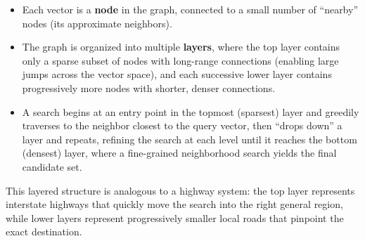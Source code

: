 \documentclass[11pt,a4paper]{article}
\begin{document}
\begin{itemize}
  \item Each vector is a \textbf{node} in the graph, connected to a small number of ``nearby'' nodes (its approximate neighbors).
  \item The graph is organized into multiple \textbf{layers}, where the top layer contains only a sparse subset of nodes with long-range connections (enabling large jumps across the vector space), and each successive lower layer contains progressively more nodes with shorter, denser connections.
  \item A search begins at an entry point in the topmost (sparsest) layer and greedily traverses to the neighbor closest to the query vector, then ``drops down'' a layer and repeats, refining the search at each level until it reaches the bottom (densest) layer, where a fine-grained neighborhood search yields the final candidate set.
\end{itemize}

This layered structure is analogous to a highway system: the top layer represents interstate highways that quickly move the search into the right general region, while lower layers represent progressively smaller local roads that pinpoint the exact destination.
\end{document}
